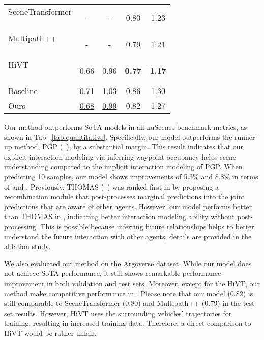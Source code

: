\documentclass{article} \usepackage{iclr2023_conference,times}
\begin{document}
\begin{table}[]
\begin{minipage}{.45\linewidth}
{\begin{tabular}{l|cc|cc}
        \rule{0pt}{9pt}\makecell[l]{SceneTransformer \\ ~\cite{varadarajan2022multipath++}}                            & -                & -                & 0.80             & 1.23             \\
        \rule{0pt}{9pt}\makecell[l]{Multipath++ \\ ~\cite{varadarajan2022multipath++}}                                 & -                & -                & \underline{0.79} & \underline{1.21} \\
        \rule{0pt}{9pt}\makecell[l]{HiVT \\ ~\cite{zhou2022hivt}}                                        & 0.66             & 0.96             & \textbf{0.77}    & \textbf{1.17}    \\ \hline
        Baseline                                    & 0.71             & 1.03             &  0.86                & 1.30                 \\
        Ours                                        & \underline{0.68} & \underline{0.99} &  0.82                & 1.27             \\ 
        \bottomrule
        \end{tabular}}
\end{minipage}
\vspace{-5pt}
\end{table}

Our method outperforms SoTA models in all nuScenes benchmark metrics, as shown in Tab.~\ref{tab:quantitative}.
Specifically, our model outperforms the runner-up method, PGP (~\cite{deo2022multimodal}), by a substantial margin.
This result indicates that our explicit interaction modeling via inferring waypoint occupancy helps scene understanding compared to the implicit interaction modeling of PGP.
When predicting 10 samples, our model shows improvements of 5.3\% and 8.8\% in terms of  and .
Previously, THOMAS (~\cite{gilles2022thomas}) was ranked first in  by proposing a recombination module that post-processes marginal predictions into the joint predictions that are aware of other agents.
However, our model performs better than THOMAS in , indicating better interaction modeling ability without post-processing.
This is possible because inferring future relationships helps to better understand the future interaction with other agents; details are provided in the ablation study.

We also evaluated our method on the Argoverse dataset.
While our model does not achieve SoTA performance, it still shows remarkable performance improvement in both validation and test sets.
Moreover, except for the HiVT, our method make competitive performance in .
Please note that our model (0.82) is still comparable to SceneTransformer (0.80) and Multipath++ (0.79) in the test set results.
However, HiVT uses the surrounding vehicles' trajectories for training, resulting in increased training data.
Therefore, a direct comparison to HiVT would be rather unfair.
\end{document}
